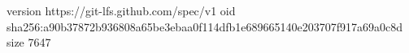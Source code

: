 version https://git-lfs.github.com/spec/v1
oid sha256:a90b37872b936808a65be3ebaa0f114dfb1e689665140e203707f917a69a0c8d
size 7647

